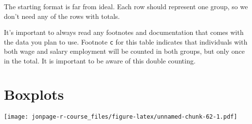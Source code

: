\documentclass[]{book}
\newenvironment{Shaded}{\begin{snugshade}}{\end{snugshade}}
\newcommand{\KeywordTok}[1]{\textcolor[rgb]{0.13,0.29,0.53}{\textbf{{#1}}}}
\newcommand{\DataTypeTok}[1]{\textcolor[rgb]{0.13,0.29,0.53}{{#1}}}
\newcommand{\DecValTok}[1]{\textcolor[rgb]{0.00,0.00,0.81}{{#1}}}
\newcommand{\StringTok}[1]{\textcolor[rgb]{0.31,0.60,0.02}{{#1}}}
\newcommand{\NormalTok}[1]{{#1}}
\theoremstyle{definition}
\theoremstyle{definition}
\theoremstyle{remark}
\begin{document}
The starting format is far from ideal. Each row should represent one
group, so we don't need any of the rows with totals.

It's important to always read any footnotes and documentation that comes
with the data you plan to use. Footnote \texttt{c} for this table
indicates that individuals with both wage and salary employment will be
counted in both groups, but only once in the total. It is important to
be aware of this double counting.

\begin{Shaded}
\end{Shaded}

\section{Boxplots}\label{boxplots}

\begin{Shaded}
\end{Shaded}

\texttt{[image: jonpage-r-course\_files/figure-latex/unnamed-chunk-62-1.pdf]}

\begin{Shaded}
\end{Shaded}
\end{document}
